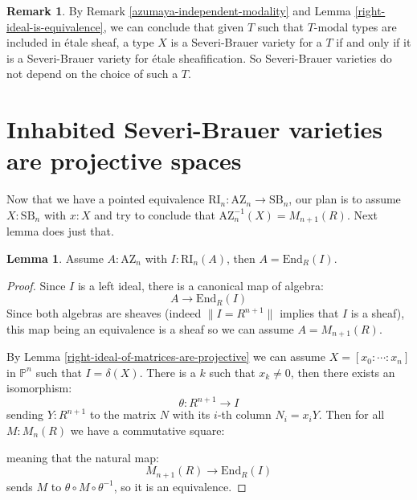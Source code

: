 \documentclass[10pt,a4paper]{article}
\theoremstyle{definition}
\newtheorem{lemma}[theorem]{Lemma}
\newtheorem{remark}[theorem]{Remark}
\newcommand{\SB}{\mathrm{SB}}
\newcommand{\RI}{\mathrm{RI}}
\newcommand{\AZ}{\mathrm{AZ}}
\newcommand{\propTrunc}[1]{\lVert #1 \rVert}
\newcommand{\bP}{\mathbb{P}}
\begin{document}
\begin{remark}\label{severi-brauer-independent-modality}
By Remark \ref{azumaya-independent-modality} and Lemma \ref{right-ideal-is-equivalence}, we can conclude that given $T$ such that $T$-modal types are included in étale sheaf, a type $X$ is a Severi-Brauer variety for a $T$ if and only if it is a Severi-Brauer variety for étale sheafification. So Severi-Brauer varieties do not depend on the choice of such a $T$.
\end{remark}


\section{Inhabited Severi-Brauer varieties are projective spaces}

Now that we have a pointed equivalence $\RI_n:\AZ_n \to \SB_n$, our plan is to assume $X:\SB_n$ with $x:X$ and try to conclude that $\AZ_n^{-1}(X) = M_{n+1}(R)$. Next lemma does just that.

\begin{lemma}\label{azumaya-with-right-ideal}
Assume $A:\AZ_n$ with $I:\RI_n(A)$, then $A = \mathrm{End}_R(I)$.
\end{lemma}

\begin{proof}
Since $I$ is a left ideal, there is a canonical map of algebra:
\[A \to\mathrm{End}_R(I)\]
Since both algebras are sheaves (indeed $\propTrunc{I=R^{n+1}}$ implies that $I$ is a sheaf), this map being an equivalence is a sheaf so we can assume $A=M_{n+1}(R)$.

By Lemma \ref{right-ideal-of-matrices-are-projective} we can assume $X=[x_0:\cdots:x_n]$ in $\bP^n$ such that $I=\delta(X)$. There is a $k$ such that $x_k\not=0$, then there exists an isomorphism:
\[\theta:R^{n+1}\to I\]
sending $Y:R^{n+1}$ to the matrix $N$ with its $i$-th column $N_i=x_iY$. Then for all $M:M_n(R)$ we have a commutative square:
\begin{center}
\end{center}
meaning that the natural map:
\[ M_{n+1}(R)\to \mathrm{End}_R(I)\]
sends $M$ to $\theta\circ M\circ\theta^{-1}$, so it is an equivalence.
\end{proof}
\end{document}
